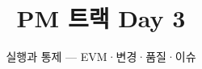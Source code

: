 \documentclass[aspectratio=169,11pt,t]{beamer}
\title{PM 트랙 Day 3}
\subtitle{실행과 통제 — EVM·변경·품질·이슈}
\begin{document}
\begin{frame}[plain,c]
\titlepage
\end{frame}

\end{document}
